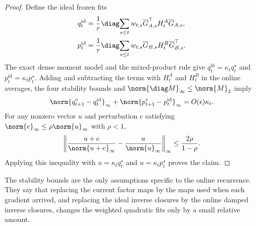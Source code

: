 \begin{proof}
Define the ideal frozen fits
\[
\begin{aligned}
  q^{\mathrm{id}}_t
  &=
  \frac1r\diag\!\sum_{s\le t}w_{t,s}
  \overline G_{A,s}^\top H^A_t\overline G_{A,s},
  \\
  p^{\mathrm{id}}_t
  &=
  \frac1r\diag\!\sum_{s\le t}w_{t,s}
  \overline G_{B,s}H^B_t\overline G_{B,s}^\top .
\end{aligned}
\]
The exact dense moment model and the mixed-product rule give
$q^{\mathrm{id}}_t=\kappa_tq^\star_t$ and
$p^{\mathrm{id}}_t=\kappa_tp^\star_t$. Adding and subtracting the terms with
$H^A_t$ and $H^B_t$ in the online averages, the four stability bounds and
$\norm{\diag M}_\infty\le\norm{M}_2$ imply
\[
  \norm{q^\circ_{t+1}-q^{\mathrm{id}}_t}_\infty
  +
  \norm{p^\circ_{t+1}-p^{\mathrm{id}}_t}_\infty
  =
  O(\epsilon)\kappa_t .
\]
For any nonzero vector $u$ and perturbation $e$ satisfying
$\norm{e}_\infty\le\rho\norm{u}_\infty$ with $\rho<1$,
\[
  \left\|
    \frac{u+e}{\norm{u+e}_\infty}
    -
    \frac{u}{\norm{u}_\infty}
  \right\|_\infty
  \le
  \frac{2\rho}{1-\rho}.
\]
Applying this inequality with $u=\kappa_tq^\star_t$ and
$u=\kappa_tp^\star_t$ proves the claim.
\end{proof}

The stability bounds are the only assumptions specific to the online
recurrence. They say that replacing the current factor maps by the maps used
when each gradient arrived, and replacing the ideal inverse closures by the
online damped inverse closures, changes the weighted quadratic fits only by a
small relative amount.

